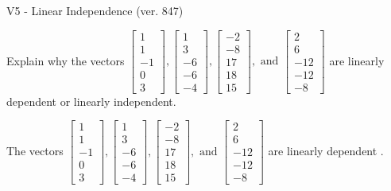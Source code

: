 \begin{exercise}
  \begin{exerciseTitle}V5 - Linear Independence (ver. 847)\end{exerciseTitle}
  \begin{exerciseStatement}
    Explain why the vectors \(\left[\begin{array}{r}
1 \\
1 \\
-1 \\
0 \\
3
\end{array}\right] , \left[\begin{array}{r}
1 \\
3 \\
-6 \\
-6 \\
-4
\end{array}\right] , \left[\begin{array}{r}
-2 \\
-8 \\
17 \\
18 \\
15
\end{array}\right] , \text{ and } \left[\begin{array}{r}
2 \\
6 \\
-12 \\
-12 \\
-8
\end{array}\right]\) are linearly dependent or linearly independent.	


  \end{exerciseStatement}
  \begin{exerciseAnswer}
   The vectors \(\left[\begin{array}{r}
1 \\
1 \\
-1 \\
0 \\
3
\end{array}\right] , \left[\begin{array}{r}
1 \\
3 \\
-6 \\
-6 \\
-4
\end{array}\right] , \left[\begin{array}{r}
-2 \\
-8 \\
17 \\
18 \\
15
\end{array}\right] , \text{ and } \left[\begin{array}{r}
2 \\
6 \\
-12 \\
-12 \\
-8
\end{array}\right]\) are 
  	 linearly dependent  .
  


  \end{exerciseAnswer}
\end{exercise}
